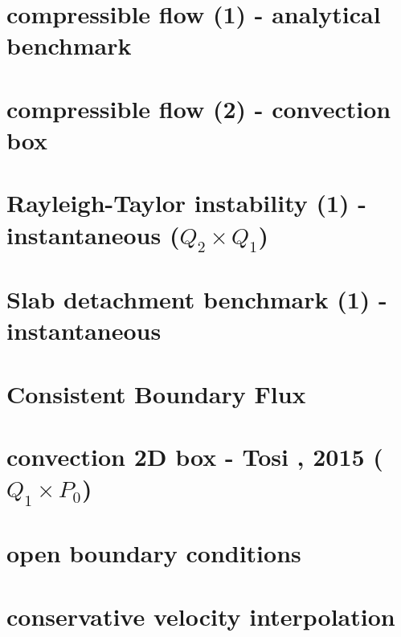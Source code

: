 \documentclass[a4paper,11pt]{report}
\begin{document}
\chapter{compressible flow (1) - analytical benchmark \label{f23}}


\chapter{compressible flow (2) - convection box \label{f24}}


\chapter{Rayleigh-Taylor instability (1) - instantaneous ($Q_2\times Q_1$)\label{f25}}

\chapter{Slab detachment benchmark (1) - instantaneous \label{f26}}

\chapter{Consistent Boundary Flux \label{f27}} %

\chapter{convection 2D box - Tosi \etal, 2015 ($Q_1\times P_0$) \label{f28}} %

\chapter{open boundary conditions \label{f29}} 

\chapter{conservative velocity interpolation \label{f30}} %
\end{document}
